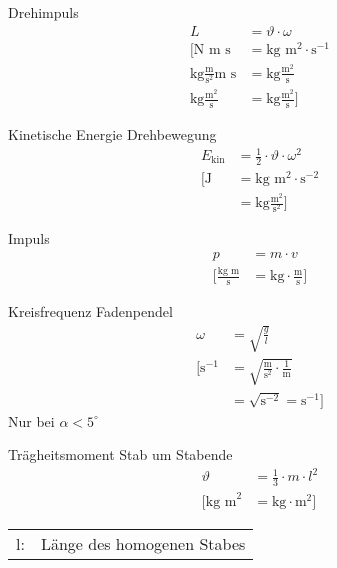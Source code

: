 \begin{karte}{Drehimpuls}
    \begin{align*}
        L &= \vartheta \cdot \omega \\
        \bigg[ \text{N m s} &= \text{kg }\text{m}^2 \cdot \text{s}^{-1} \\
            \text{kg} \frac{\text{m}}{\text{s}^2} \text{m s}&= \text{kg} \frac{\text{m}^2}{\text{s}} \\
            \text{kg} \frac{\text{m}^2}{\text{s}} &= \text{kg} \frac{\text{m}^2}{\text{s}}
            \bigg]
    \end{align*}
\end{karte}

\begin{karte}{Kinetische Energie Drehbewegung}
    \begin{align*}
        E_\text{kin} &= \frac{1}{2} \cdot \vartheta \cdot \omega^2 \\
        \bigg[ \text{J} &= \text{kg }\text{m}^2 \cdot \text{s}^{-2} \\
            &= \text{kg} \frac{\text{m}^2}{\text{s}^2} \bigg]
    \end{align*}
\end{karte}

\begin{karte}{Impuls}
    \begin{align*}
        p &= m \cdot v \\
        \bigg[ \frac{\text{kg m}}{\text{s}} &= \text{kg} \cdot \frac{\text{m}}{\text{s}} \bigg]
    \end{align*}
\end{karte}

\begin{karte}{Kreisfrequenz Fadenpendel}
    \begin{align*}
        \omega &= \sqrt{\frac{g}{l}} \\
        \bigg[ \text{s}^{-1} &= \sqrt{ \frac{\text{m}}{\text{s}^2} \cdot \frac{1}{\text{m}} } \\
            &= \sqrt{\text{s}^{-2}} = \text{s}^{-1} \bigg]
    \end{align*}
    Nur bei \(\alpha < 5^\circ\)
\end{karte}

\begin{karte}{Trägheitsmoment Stab um Stabende}
    \begin{align*}
        \vartheta &= \frac{1}{3} \cdot m \cdot l^2 \\
        \bigg[ \text{kg m}^2 &=
            \text{kg} \cdot \text{m}^2 
            \bigg]
    \end{align*}
    \begin{tabular}[t]{cl}
        l:& Länge des homogenen Stabes
    \end{tabular}
\end{karte}

